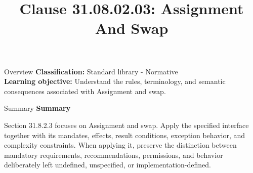 \documentclass[10pt,letterpaper]{article}
\title{Clause 31.08.02.03: Assignment And Swap}
\author{}
\date{}
\begin{document}
\maketitle
\begin{CornellOverviewBox}{Overview}
\textbf{Classification:} Standard library - Normative\\[2pt]
\textbf{Learning objective:} Understand the rules, terminology, and semantic consequences associated with Assignment and swap.
\end{CornellOverviewBox}\begin{CornellSummaryBox}{Summary}
{\sffamily\bfseries\color{Accent} Summary}\par\vspace{3pt}Section 31.8.2.3 focuses on Assignment and swap. Apply the specified interface together with its mandates, effects, result conditions, exception behavior, and complexity constraints. When applying it, preserve the distinction between mandatory requirements, recommendations, permissions, and behavior deliberately left undefined, unspecified, or implementation-defined.
\end{CornellSummaryBox}
\end{document}
